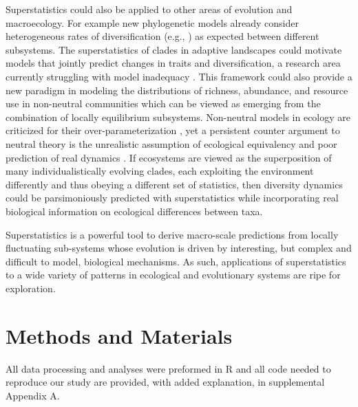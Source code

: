 \documentclass[12pt]{article}
\let\citep=\cite
\begin{document}
Superstatistics could also be applied to other areas of evolution and
macroecology.  For example new phylogenetic models already consider
heterogeneous rates of diversification (e.g., \citep{rabosky2014}) as
expected between different subsystems. The superstatistics of clades
in adaptive landscapes could motivate models that jointly predict
changes in traits and diversification, a research area currently
struggling with model inadequacy \citep{rabosky2017fisse}. This
framework could also provide a new paradigm in modeling the
distributions of richness, abundance, and resource use in non-neutral
communities which can be viewed as emerging from the combination of
locally equilibrium subsystems. Non-neutral models in ecology are
criticized for their over-parameterization \citep{rosindell2011}, yet
a persistent counter argument to neutral theory \citep{hubbell2001} is
the unrealistic assumption of ecological equivalency and poor
prediction of real dynamics \citep{rosindell2011}. If ecosystems are
viewed as the superposition of many individualistically evolving
clades, each exploiting the environment differently and thus obeying a
different set of statistics, then diversity dynamics could be
parsimoniously predicted with superstatistics while incorporating real
biological information on ecological differences between taxa.

Superstatistics is a powerful tool to derive macro-scale predictions
from locally fluctuating sub-systems whose evolution is driven by
interesting, but complex and difficult to model, biological
mechanisms. As such, applications of superstatistics to a wide variety
of patterns in ecological and evolutionary systems are ripe for
exploration.


\section{Methods and Materials}

All data processing and analyses were preformed in R \citep{rcite} and
all code needed to reproduce our study are provided, with added
explanation, in supplemental Appendix A.
\end{document}
